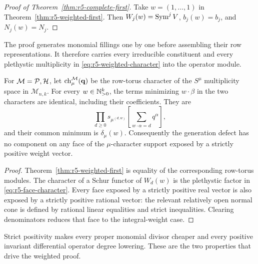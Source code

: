 \begin{proof}[Proof of Theorem~\ref{thm:r5-complete-first}]
Take $w=(1,\ldots,1)$ in Theorem~\ref{thm:r5-weighted-first}.
Then $W_j(w)=\operatorname{Sym}^jV$, $b_j(w)=b_j$, and $N_j(w)=N_j$.
\end{proof}

The proof generates monomial fillings one by one before assembling
their row representations.  It therefore carries every irreducible
constituent and every plethystic multiplicity in
\eqref{eq:r5-weighted-character} into the operator module.

\begin{corollary}
\label{cor:r5-lower-boundary}
For $\mathcal M=\mathcal P,\mathcal H$, let
$\operatorname{ch}_\mu^{\mathcal M}(\mathbf q)$ be the row-torus character
of the $S^\mu$ multiplicity space in $\mathcal M_{n,k}$.  For every
$w\in\mathbb N_{>0}^k$, the terms minimizing $w\cdot\beta$ in the two
characters are identical, including their coefficients.  They are
\begin{equation}\label{eq:r5-face-character}
 \prod_{d\geq0}
 s_{\mu^{(d,w)}}
     \left[\sum_{w\cdot\alpha=d}q^\alpha\right],
\end{equation}
and their common minimum is $\delta_\mu(w)$.
Consequently the generation defect has no component on any face
of the $\mu$-character support exposed by a strictly positive
weight vector.
\end{corollary}

\begin{proof}
Theorem~\ref{thm:r5-weighted-first} is equality of the corresponding
row-torus modules.  The character of a Schur functor of $W_d(w)$
is the plethystic factor in \eqref{eq:r5-face-character}.
Every face exposed by a strictly positive real vector is also
exposed by a strictly positive rational vector: the relevant
relatively open normal cone is defined by rational linear
equalities and strict inequalities.  Clearing denominators
reduces that face to the integral-weight case.
\end{proof}

Strict positivity makes every proper monomial divisor cheaper and
every positive invariant differential operator degree lowering.
These are the two properties that drive the weighted proof.

